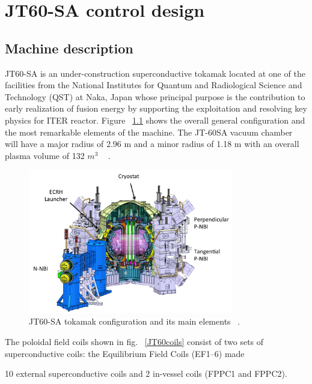 \chapter{JT60-SA control design}

\section{Machine description}

JT60-SA is an under-construction superconductive tokamak located at one of the facilities from the National Institutes for Quantum and Radiological Science and Technology (QST)  at  Naka, Japan whose principal purpose is  the contribution to early realization of fusion energy by supporting the exploitation and resolving key physics for ITER reactor. Figure ~\ref{JT60schm} shows the overall general configuration and the most remarkable elements of the machine. The JT-60SA  vacuum chamber will have a major radius of 2.96 m and a minor radius of 1.18 m with an overall plasma volume of 132 $m^3$ ~\cite{Spears2014} .
\smallskip
\begin{figure}
	\centering
	\includegraphics[width=0.80\textwidth]{Chp3/JT60SA.png}
	
	\caption{\label{JT60schm}JT60-SA tokamak configuration and its main elements ~\cite{JT60SA:ResearchPlan}.}
\end{figure}



The poloidal field coils shown in fig. ~\ref{JT60coils} consist of two sets of superconductive coils: the Equilibrium Field Coils (EF1–6) made

 10 external superconductive coils and 2 in-vessel coils (FPPC1 and FPPC2). 


